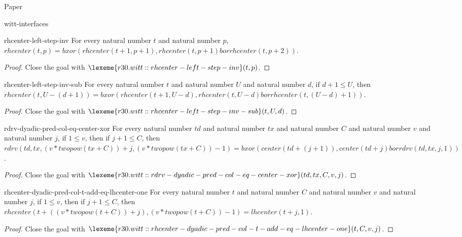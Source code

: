 \begin{lexlean}{Paper}
\begin{section}{witt-interfaces}
  \begin{theorem}{rhcenter-left-step-inv}
  For every natural number \(t\) and natural number \(p\), \(rhcenter(t, p) = bxor(rhcenter(t + 1, p + 1), rhcenter(t, p + 1) bor rhcenter(t, p + 2))\).
  \begin{proof}
  Close the goal with \(\lexeme{r30.witt::rhcenter-left-step-inv}(t, p)\).
  \end{proof}
  \end{theorem}

  \begin{theorem}{rhcenter-left-step-inv-sub}
  For every natural number \(t\) and natural number \(U\) and natural number \(d\), if \(d + 1 ≤ U\), then \(rhcenter(t, U - (d + 1)) = bxor(rhcenter(t + 1, U - d), rhcenter(t, U - d) bor rhcenter(t, (U - d) + 1))\).
  \begin{proof}
  Close the goal with \(\lexeme{r30.witt::rhcenter-left-step-inv-sub}(t, U, d)\).
  \end{proof}
  \end{theorem}

  \begin{theorem}{rdrv-dyadic-pred-col-eq-center-xor}
  For every natural number \(td\) and natural number \(tx\) and natural number \(C\) and natural number \(v\) and natural number \(j\), if \(1 ≤ v\), then if \(j + 1 ≤ C\), then \(rdrv(td, tx, (v * twopow(tx + C)) + j, (v * twopow(tx + C)) - 1) = bxor(center(td + (j + 1)), center(td + j) bor rdrv(td, tx, j, 1))\).
  \begin{proof}
  Close the goal with \(\lexeme{r30.witt::rdrv-dyadic-pred-col-eq-center-xor}(td, tx, C, v, j)\).
  \end{proof}
  \end{theorem}

  \begin{theorem}{rhcenter-dyadic-pred-col-t-add-eq-lhcenter-one}
  For every natural number \(t\) and natural number \(C\) and natural number \(v\) and natural number \(j\), if \(1 ≤ v\), then if \(j + 1 ≤ C\), then \(rhcenter(t + ((v * twopow(t + C)) + j), (v * twopow(t + C)) - 1) = lhcenter(t + j, 1)\).
  \begin{proof}
  Close the goal with \(\lexeme{r30.witt::rhcenter-dyadic-pred-col-t-add-eq-lhcenter-one}(t, C, v, j)\).
  \end{proof}
  \end{theorem}


\end{section}
\end{lexlean}
